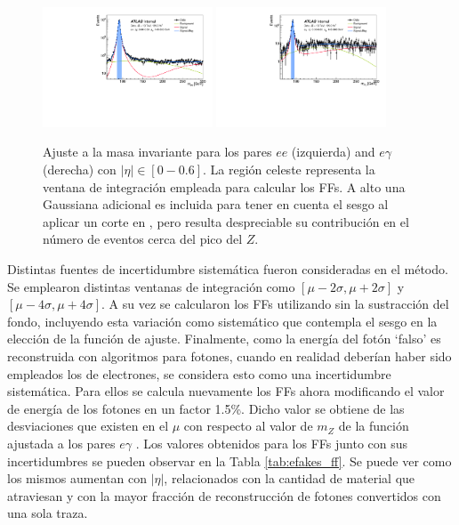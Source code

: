 \begin{figure}[ht!]
  \centering
  \includegraphics[width=0.45\textwidth]{images/analysis/egFF_fit_ee_eta_0_06.pdf}
  \includegraphics[width=0.45\textwidth]{images/analysis/egFF_fit_eg_eta_0_06.pdf}
  \caption{Ajuste a la masa invariante para los pares $ee$ (izquierda) and $e\gamma$ (derecha) con $|\eta| \in [0-0.6]$. La región celeste representa la ventana de integración empleada para calcular los FFs. A alto \pt una Gaussiana adicional es incluida para tener en cuenta el sesgo al aplicar un corte en \pt, pero resulta despreciable su contribución en el número de eventos cerca del pico del $Z$.}
  \label{fig:efakes_fit}
\end{figure}

Distintas fuentes de incertidumbre sistemática fueron consideradas en el método. Se emplearon distintas ventanas de integración como $[\mu - 2\sigma, \mu + 2\sigma]$ y $[\mu - 4\sigma, \mu + 4\sigma]$. A su vez se calcularon los FFs utilizando sin la sustracción del fondo, incluyendo esta variación como sistemático que contempla el sesgo en la elección de la función de ajuste. Finalmente, como la energía del fotón `falso' es reconstruida con algoritmos para fotones, cuando en realidad deberían haber sido empleados los de electrones, se considera esto como una incertidumbre sistemática. Para ellos se calcula nuevamente los FFs ahora modificando el valor de energía de los fotones en un factor 1.5\%. Dicho valor se obtiene de las desviaciones que existen en el $\mu$ con respecto al valor de $m_Z$ de la función ajustada a los pares $e\gamma$ \cite{ATL-COM-PHYS-2016-1626}. Los valores obtenidos para los FFs junto con sus incertidumbres se pueden observar en la Tabla \ref{tab:efakes_ff}. Se puede ver como los mismos aumentan con $|\eta|$, relacionados con la cantidad de material que atraviesan y con la mayor fracción de reconstrucción de fotones convertidos con una sola traza.


